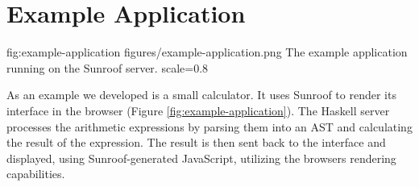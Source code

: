  
\section{Example Application}
\label{sec:extended-example}

\FigureS%
{fig:example-application}%
{figures/example-application.png}%
{The example application running on the Sunroof server.}%
{scale=0.8}

As an example we developed is a small calculator. It uses Sunroof to
render its interface in the browser (Figure \ref{fig:example-application}). The 
Haskell server processes the arithmetic expressions by parsing them
into an AST and calculating the result of the expression.
The result is then sent back to the interface and displayed,
using Sunroof-generated JavaScript, 
utilizing the browsers rendering capabilities.



